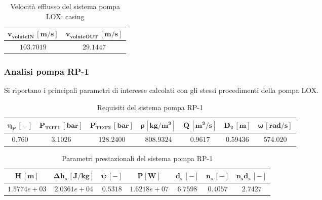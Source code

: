 \begin{table}[H]
\centering
\begin{tabular}{|c|c|}
\hline
$\bm{v_{voluteIN} \, [m/s]}$ & $\bm{v_{voluteOUT} \, [m/s]}$  \\
\hline
$103.7019$ & $29.1447$   \\
\hline
\end{tabular}

\caption{Velocità efflusso del sistema pompa LOX: casing}
\label{table:LOX pump casing}

\end{table}

\subsubsection{Analisi pompa RP-1}
Si riportano i principali parametri di interesse calcolati con gli stessi procedimenti della pompa LOX.

\begin{table}[H]
\centering
\begin{tabular}{|c|c|c|c|c|c|c|}
\hline
$\bm{\eta_P \, [-]}$ & $\bm{P_ {TOT1} \, [bar]}$ & $\bm{P_{TOT2} \, [bar]}$ & $\bm{\rho [kg/m^3]}$ & $\bm{Q \, [m^3/s]}$ & $\bm{D_2 \, [m]}$ & $\bm{\omega \, [rad/s]}$  \\
\hline
$0.760$ & $3.1026$ & $128.2400$ &  $808.9324$ & $0.9617$ & $0.59436$ & $574.020$  \\
\hline
\end{tabular}

\caption{Requisiti del sistema pompa RP-1 \cite{turbopump_manual}}
\label{table:RP-1 pump specs}

\end{table}

\begin{table}[H]
\centering
\begin{tabular}{|c|c|c|c|c|c|c|}
\hline
$\bm{H \, [m]}$ & $\bm{\Delta h_s \, [J/kg]}$ & $\bm{\psi \, [-]}$ & $\bm{P [W]}$ & $\bm{d_s \, [-]}$ & $\bm{n_s \, [-]}$ & $\bm{n_s d_s \, [-]}$  \\
\hline
$1.5774e+03$ & $2.0361e+04$ & $0.5318$ &  $1.6218e+07$ & $6.7598$ & $0.4057$ & $2.7427$  \\
\hline
\end{tabular}

\caption{Parametri prestazionali del sistema pompa RP-1}
\label{table:RP-1 pump performance}

\end{table}

